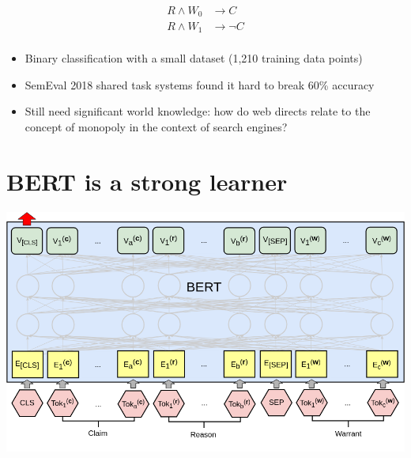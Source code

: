 \documentclass[a0,portrait]{a0poster}
\begin{document}
\begin{multicols}{2}
\begin{align*}
    R \land W_0 &\rightarrow C \\
    R \land W_1 &\rightarrow \lnot C \\
\end{align*}

\vspace{8pt}

\begin{itemize}
    \item Binary classification with a small dataset (1,210 training data points)
    \item SemEval 2018 shared task systems found it hard to break 60\% accuracy
    \item Still need significant world knowledge: how do web directs relate to the concept of monopoly in the context of search engines?
\end{itemize}

\section*{BERT is a strong learner}

\vspace{8pt}

\begin{center}
  \includegraphics[width=0.8\linewidth]{BERT_ARCT.png}
\end{center}


\end{multicols}
\end{document}

